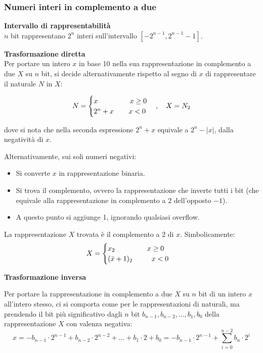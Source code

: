 \documentclass[a4paper,11pt]{article}
\begin{document}
\subsubsection{Numeri interi in complemento a due}

\textbf{\textsf{Intervallo di rappresentabilità}} \\
$n$ bit rappresentano $2^n$ interi sull'intervallo $ [-2^{n-1}, 2^{n-1} - 1]$.

\par\medskip
\noindent
\textbf{\textsf{Trasformazione diretta}} \\
Per portare un intero $x$ in base 10 nella sua rappresentazione in complemento a due $X$ su $n$ bit, si decide alternativamente rispetto al segno di $x$ di rappresentare il naturale $N$ in $X$:

\[
	N =
	\begin{cases}
		x \hspace{1.6cm} x \geq 0 \\ 
		2^{n} + x \hspace {0.75cm} x < 0 
	\end{cases}, \quad 
	X = N_2
\]

dove si nota che nella seconda espressione $2^n + x$ equivale a $2^n - |x|$, dalla negatività di $x$.

\par\smallskip

Alternativamente, sui soli numeri negativi:
\begin{itemize}
	\item Si converte $x$ in rappresentazione binaria.
	\item Si trova il complemento, ovvero la rappresentazione che inverte tutti i bit (che equivale alla rappresentazione in complemento a 2 dell'opposto $- 1$). 
	\item A questo punto si aggiunge 1, ignorando qualsiasi overflow.
\end{itemize}
La rappresentazione $X$ trovata è il complemento a 2 di $x$.
Simbolicamente:
\[
	X =
	\begin{cases}
		x_2 \hspace{1.6cm} x \geq 0 \\ 
		(\bar{x} + 1)_2 \hspace {0.95cm} x < 0 
	\end{cases}
\]

\par\medskip
\noindent
\textbf{\textsf{Trasformazione inversa}}

Per portare la rappresentazione in complemento a due $X$ su $n$ bit di un intero $x$ all'intero stesso, ci si comporta come per le rappresentazioni di naturali, ma prendendo il bit più significativo dagli $n$ bit $b_{n-1}, b_{n-2}, ... , b_1, b_0$ della rappresentazione $X$ con valenza negativa:
$$
x = -b_{n-1} \cdot 2^{n-1} + b_{n-2} \cdot 2^{n-2} + ... + b_1 \cdot 2 + b_0 = -b_{n-1} \cdot 2^{n-1} + \sum_{i=0}^{n-2} b_n \cdot 2^i
$$
\end{document}
